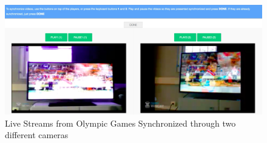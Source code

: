 \begin{figure}[h!]
	\centerline{\includegraphics[scale=0.3] {figures/screen}}
	\caption{Live Streams from Olympic Games Synchronized through two different cameras}
	\label{live_tvs}
\end{figure}


